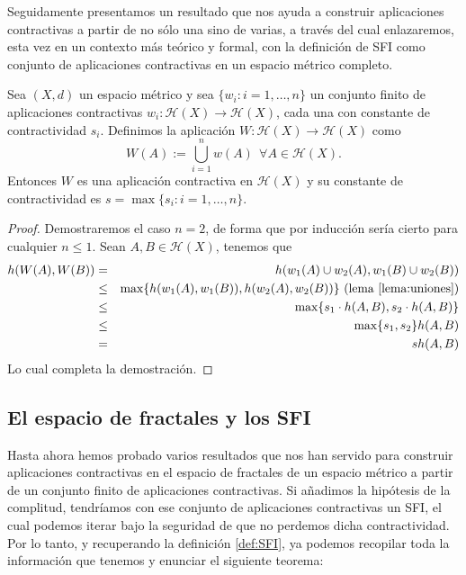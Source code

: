 Seguidamente presentamos un resultado que nos ayuda a construir aplicaciones contractivas a partir de no sólo una sino de varias, a través del cual enlazaremos, esta vez en un contexto más teórico y formal, con la definición de SFI como conjunto de aplicaciones contractivas en un espacio métrico completo.

\begin{proposicion}
    Sea $(X,d)$ un espacio métrico y sea $\{w_i:i=1,\dots,n\}$ un conjunto finito de aplicaciones contractivas $w_i:\mathcal{H}(X)\longrightarrow\mathcal{H}(X)$, cada una con constante de contractividad $s_i$. Definimos la aplicación $W:\mathcal{H}(X)\longrightarrow\mathcal{H}(X)$ como
    \begin{equation}
        \label{eqn:W}
        W(A) := \bigcup_{i=1}^n w(A) \ \ \forall A\in\mathcal{H}(X).
    \end{equation}
    Entonces $W$ es una aplicación contractiva en $\mathcal{H}(X)$ y su constante de contractividad es $s=\max\{s_i:i=1,\dots,n\}$.
\end{proposicion}
\begin{proof}
    Demostraremos el caso $n=2$, de forma que por inducción sería cierto para cualquier $n\leq 1$. Sean $A,B\in\mathcal{H}(X)$, tenemos que
    \begin{eqnarray*}
    h(W(A),W(B)) & = & h(w_1(A)\cup w_2(A), w_1(B)\cup w_2(B)) \\
                 & \leq & \max\{h(w_1(A),w_1(B)), h(w_2(A),w_2(B))\}\text{ (lema \ref{lema:uniones})} \\
                 & \leq & \max\{s_1\cdot h(A,B), s_2\cdot h(A,B) \} \\
                 & \leq & \max\{s_1,s_2\} h(A,B) \\
                 & = & s h(A,B)
    \end{eqnarray*}
    Lo cual completa la demostración.
\end{proof}

\subsection{El espacio de fractales y los SFI}

Hasta ahora hemos probado varios resultados que nos han servido para construir aplicaciones contractivas en el espacio de fractales de un espacio métrico a partir de un conjunto finito de aplicaciones contractivas. Si añadimos la hipótesis de la complitud, tendríamos con ese conjunto de aplicaciones contractivas un SFI, el cual podemos iterar bajo la seguridad de que no perdemos dicha contractividad. Por lo tanto, y recuperando la definición \ref{def:SFI}, ya podemos recopilar toda la información que tenemos y enunciar el siguiente teorema:

